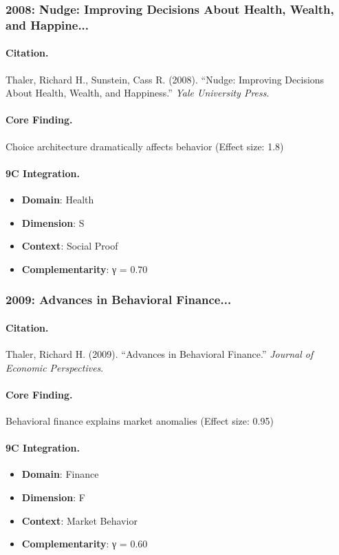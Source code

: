 \subsubsection{2008: Nudge: Improving Decisions About Health, Wealth, and Happine...}

\paragraph{Citation.}
Thaler, Richard H., Sunstein, Cass R. (2008). ``Nudge: Improving Decisions About Health, Wealth, and Happiness.''
\textit{Yale University Press}.

\paragraph{Core Finding.}
Choice architecture dramatically affects behavior (Effect size: 1.8)

\paragraph{9C Integration.}
\begin{itemize}[nosep]
  \item \textbf{Domain}: Health
  \item \textbf{Dimension}: S
  \item \textbf{Context}: Social Proof
  \item \textbf{Complementarity}: γ = 0.70
\end{itemize}

\subsubsection{2009: Advances in Behavioral Finance...}

\paragraph{Citation.}
Thaler, Richard H. (2009). ``Advances in Behavioral Finance.''
\textit{Journal of Economic Perspectives}.

\paragraph{Core Finding.}
Behavioral finance explains market anomalies (Effect size: 0.95)

\paragraph{9C Integration.}
\begin{itemize}[nosep]
  \item \textbf{Domain}: Finance
  \item \textbf{Dimension}: F
  \item \textbf{Context}: Market Behavior
  \item \textbf{Complementarity}: γ = 0.60
\end{itemize}

